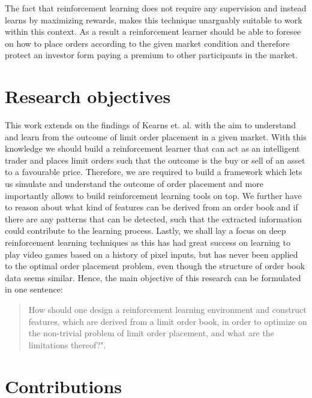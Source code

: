 The fact that reinforcement learning does not require any supervision and instead learns by maximizing rewards, makes this technique unarguably suitable to work within this context.
As a result a reinforcement learner should be able to foresee on how to place orders according to the given market condition and therefore protect an investor form paying a premium to other participants in the market.

\section{Research objectives}

This work extends on the findings of Kearns et. al. \cite{nevmyvaka2006reinforcement} with the aim to understand and learn from the outcome of limit order placement in a given market.
With this knowledge we should build a reinforcement learner that can act as an intelligent trader and places limit orders such that the outcome is the buy or sell of an asset to a favourable price.
Therefore, we are required to build a framework which lets us simulate and understand the outcome of order placement and more importantly allows to build reinforcement learning tools on top.
We further have to reason about what kind of features can be derived from an order book and if there are any patterns that can be detected, such that the extracted information could contribute to the learning process.
Lastly, we shall lay a focus on deep reinforcement learning techniques as this has had great success on learning to play video games \cite{mnih2013playing} based on a history of pixel inputs, but has never been applied to the optimal order placement problem, even though the structure of order book data seems similar.
Hence, the main objective of this research can be formulated in one sentence: \begin{quote}
    How should one design a reinforcement learning environment and construct features, which are derived from a limit order book, in order to optimize on the non-trivial problem of limit order placement, and what are the limitations thereof?".
\end{quote}

\section{Contributions}

